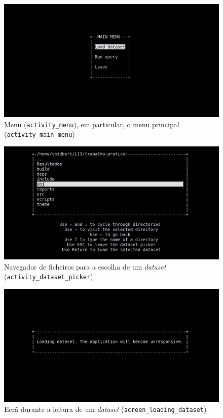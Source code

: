 \documentclass[12pt, a4paper]{article}
\begin{document}
\begin{figure}[ht]
    \centering
    \includegraphics[scale=0.25]{res-fase2/interactive_screenshots/main_menu.png}
    \caption{Menu (\texttt{activity\_menu}), em particular, o menu principal
             (\texttt{activity\_main\_menu})}
    \label{fig:main_menu}
\end{figure}

\begin{figure}[ht]
    \centering
    \includegraphics[scale=0.25]{res-fase2/interactive_screenshots/dataset_picker.png}
    \caption{Navegador de ficheiros para a escolha de um \emph{dataset}
             (\texttt{activity\_dataset\_picker})}
    \label{fig:dataset_picker}
\end{figure}

\begin{figure}[ht]
    \centering
    \includegraphics[scale=0.25]{res-fase2/interactive_screenshots/loading_dataset.png}
    \caption{Ecrã durante a leitura de um \emph{dataset} (\texttt{screen\_loading\_dataset})}
    \label{fig:loading_dataset}
\end{figure}
\end{document}
